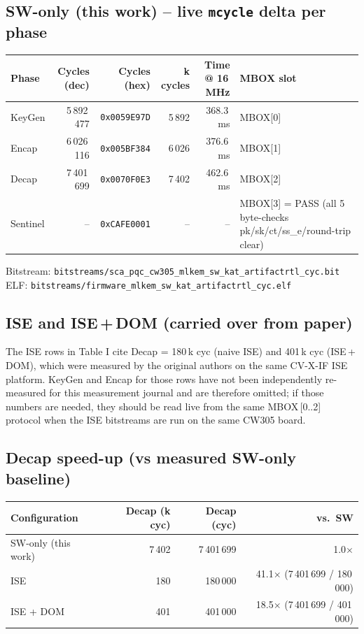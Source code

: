 \documentclass[11pt]{article}
\newcommand{\swart}{}                              %
\begin{document}
\subsection{SW-only (this work) -- live \texttt{mcycle} delta per phase}

\begin{tabularx}{\linewidth}{@{}lrrrrl@{}}
\toprule
Phase   & Cycles (dec) & Cycles (hex) & k cycles & Time @ 16\,MHz & MBOX slot \\
\midrule
KeyGen  & 5\,892\,477  & \texttt{0x0059E97D} & 5\,892 & 368.3\,ms & MBOX[0] \\
Encap   & 6\,026\,116  & \texttt{0x005BF384} & 6\,026 & 376.6\,ms & MBOX[1] \\
Decap   & 7\,401\,699  & \texttt{0x0070F0E3} & 7\,402 & 462.6\,ms & MBOX[2] \\
\midrule
Sentinel & --          & \texttt{0xCAFE0001} & --     & --        & MBOX[3] = PASS (all 5 byte-checks pk/sk/ct/ss\_e/round-trip clear) \\
\bottomrule
\end{tabularx}

\medskip
Bitstream: \texttt{\swart{}bitstreams/sca\_pqc\_cw305\_mlkem\_sw\_kat\_artifactrtl\_cyc.bit}\\
ELF:       \texttt{\swart{}bitstreams/firmware\_mlkem\_sw\_kat\_artifactrtl\_cyc.elf}

\subsection{ISE and ISE\,+\,DOM (carried over from paper)}

The ISE rows in Table I cite Decap = 180\,k cyc (naive ISE) and 401\,k cyc
(ISE\,+\,DOM), which were measured by the original authors on the same CV-X-IF
ISE platform. KeyGen and Encap for those rows have not been independently
re-measured for this measurement journal and are therefore omitted; if those
numbers are needed, they should be read live from the same MBOX\,[0..2]
protocol when the ISE bitstreams are run on the same CW305 board.

\subsection{Decap speed-up (vs measured SW-only baseline)}

\begin{tabularx}{\linewidth}{@{}lrrr@{}}
\toprule
Configuration & Decap (k cyc) & Decap (cyc) & vs.\ SW \\
\midrule
SW-only (this work) & 7\,402 & 7\,401\,699 & 1.0$\times$ \\
ISE                 & 180    & 180\,000    & 41.1$\times$ (7\,401\,699 / 180\,000) \\
ISE + DOM           & 401    & 401\,000    & 18.5$\times$ (7\,401\,699 / 401\,000) \\
\bottomrule
\end{tabularx}
\end{document}
